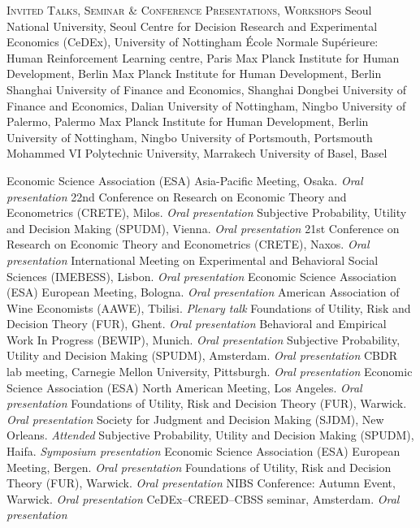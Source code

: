 \begin{rubric}{\textsc{Invited Talks, Seminar \& Conference Presentations, Workshops}}
%
\entry*[2026] Seoul National University, Seoul
\entry*[2026] Centre for Decision Research and Experimental Economics (CeDEx), University of Nottingham
\entry*[2025] \'{E}cole Normale Sup\'{e}rieure: Human Reinforcement Learning centre, Paris
\entry*[2025] Max Planck Institute for Human Development, Berlin
\entry*[2023] Max Planck Institute for Human Development, Berlin
\entry*[2023] Shanghai University of Finance and Economics, Shanghai
\entry*[2023] Dongbei University of Finance and Economics, Dalian
\entry*[2023] University of Nottingham, Ningbo
\entry*[2021] University of Palermo, Palermo
\entry*[2020] Max Planck Institute for Human Development, Berlin
\entry*[2020] University of Nottingham, Ningbo
\entry*[2020] University of Portsmouth, Portsmouth
\entry*[2019] Mohammed VI Polytechnic University, Marrakech 
\entry*[2018] University of Basel, Basel
%

\entry*[2025] Economic Science Association (ESA) Asia-Pacific Meeting, Osaka. \textit{Oral presentation}
\entry*[2024] 22nd Conference on Research on Economic Theory and Econometrics (CRETE), Milos. \textit{Oral presentation}
\entry*[2023] Subjective Probability, Utility and Decision Making (SPUDM), Vienna. \textit{Oral presentation}
\entry*[2023] 21st Conference on Research on Economic Theory and Econometrics (CRETE), Naxos. \textit{Oral presentation}
\entry*[2023] International Meeting on Experimental and Behavioral Social Sciences (IMEBESS), Lisbon. \textit{Oral presentation}
\entry*[2022] Economic Science Association (ESA) European Meeting, Bologna. \textit{Oral presentation}
\entry*[2022] American Association of Wine Economists (AAWE), Tbilisi. \textit{Plenary talk}
\entry*[2022] Foundations of Utility, Risk and Decision Theory (FUR), Ghent. \textit{Oral presentation}
\entry*[2020] Behavioral and Empirical Work In Progress (BEWIP), Munich. \textit{Oral presentation}
\entry*[2019] Subjective Probability, Utility and Decision Making (SPUDM), Amsterdam. \textit{Oral presentation}
\entry*[2019] CBDR lab meeting, Carnegie Mellon University, Pittsburgh. \textit{Oral presentation}
\entry*[2019] Economic Science Association (ESA) North American Meeting, Los Angeles. \textit{Oral presentation}
\entry*[2018] Foundations of Utility, Risk and Decision Theory (FUR), Warwick. \textit{Oral presentation}
\entry*[2018] Society for Judgment and Decision Making (SJDM), New Orleans. \textit{Attended}
\entry*[2017] Subjective Probability, Utility and Decision Making (SPUDM), Haifa. \textit{Symposium presentation}
\entry*[2016] Economic Science Association (ESA) European Meeting, Bergen. \textit{Oral presentation}
\entry*[2016] Foundations of Utility, Risk and Decision Theory (FUR), Warwick. \textit{Oral presentation}
\entry*[2016] NIBS Conference: Autumn Event, Warwick. \textit{Oral presentation}
\entry*[2016] CeDEx--CREED--CBSS seminar, Amsterdam. \textit{Oral presentation} 
%


\end{rubric}
